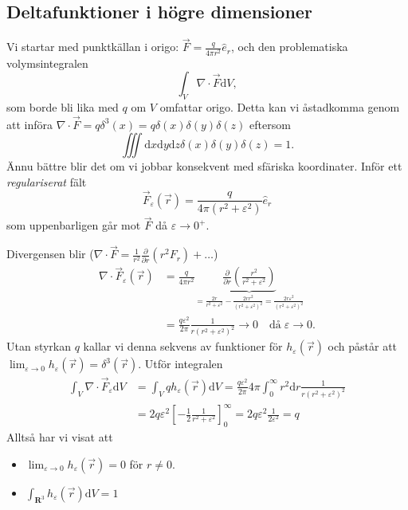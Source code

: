 \documentclass[%
oneside,                 %
final,                   %
10pt]{article}
\begin{document}
\subsection{Deltafunktioner i högre dimensioner}

Vi startar med punktkällan i origo: $\vec{F} = \frac{q}{4 \pi r^2} \hat{e}_r$, och den problematiska volymsintegralen
$$
\int_V \nabla \cdot \vec{F} \mbox{d}V,
$$
som borde bli lika med $q$ om $V$ omfattar origo. Detta kan vi åstadkomma genom att införa $\nabla \cdot \vec{F} = q \delta^3(x) = q \delta(x)\delta(y)\delta(z)$ eftersom
$$
\iiint \mbox{d}x \mbox{d}y \mbox{d}z \delta(x)\delta(y)\delta(z) = 1.
$$
Ännu bättre blir det om vi jobbar konsekvent med sfäriska koordinater. Inför ett \emph{regulariserat} fält
\begin{equation}
\vec{F}_\varepsilon(\vec{r}) = \frac{q}{4 \pi (r^2 + \varepsilon^2)} \hat{e}_r
\end{equation}
som uppenbarligen går mot $\vec{F}$ då $\varepsilon \to 0^+$.

Divergensen blir ($\nabla \cdot \vec{F} = \frac{1}{r^2} \frac{\partial}{\partial r} (r^2 F_r) + \ldots$)
\begin{align}
\nabla \cdot \vec{F}_\varepsilon(\vec{r}) &= \frac{q}{4 \pi r^2} \underbrace{\frac{\partial}{\partial r} \left( \frac{r^2}{r^2 + \varepsilon^2} \right)}_{=\frac{2r}{r^2 + \varepsilon^2} - \frac{2 r r^2}{(r^2 + \varepsilon^2)^2} = \frac{2 r \varepsilon^2}{(r^2 + \varepsilon^2)^2}} \\ 
&= \frac{q \varepsilon^2}{2 \pi} \frac{1}{r(r^2 + \varepsilon^2)^2} \to 0 \quad \mathrm{då} \; \varepsilon \to 0.
\end{align}
Utan styrkan $q$ kallar vi denna sekvens av funktioner för $h_\varepsilon(\vec{r})$ och påstår att $\lim_{\varepsilon \to 0} h_\varepsilon(\vec{r}) = \delta^3(\vec{r})$. Utför integralen
\begin{align}
\int_V \nabla \cdot \vec{F}_\varepsilon \mbox{d} V &= \int_V q h_\varepsilon(\vec{r}) \mbox{d} V = \frac{ q \varepsilon^2}{2 \pi} 4\pi \int_0^\infty r^2 \mbox{d} r \frac{1}{r(r^2 + \varepsilon^2)^2} \\ 
&= 2 q \varepsilon^2 \left[ -\frac{1}{2} \frac{1}{r^2 + \varepsilon^2} \right]_0^\infty = 2 q \varepsilon^2 \frac{1}{2 \varepsilon^2} = q
\end{align}
Alltså har vi visat att
\begin{itemize}
\item $\lim_{\varepsilon \to 0} h_\varepsilon(\vec{r}) = 0$ för $r \neq 0$.

\item $\int_{\mathbf{R}^3} h_\varepsilon(\vec{r}) \mbox{d}V = 1$
\end{itemize}
\end{document}
